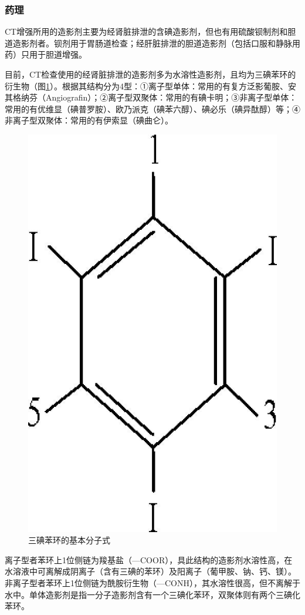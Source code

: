 \subsubsection{药理}

CT增强所用的造影剂主要为经肾脏排泄的含碘造影剂，但也有用硫酸钡制剂和胆道造影剂者。钡剂用于胃肠道检查；经肝脏排泄的胆道造影剂（包括口服和静脉用药）只用于胆道增强。

目前，CT检查使用的经肾脏排泄的造影剂多为水溶性造影剂，且均为三碘苯环的衍生物（图\ref{fig1-1}）。根据其结构分为4型：①离子型单体：常用的有复方泛影葡胺、安其格纳芬（Angiografin）；②离子型双聚体：常用的有碘卡明；③非离子型单体：常用的有优维显（碘普罗胺）、欧乃派克（碘苯六醇）、碘必乐（碘异酞醇）等；④非离子型双聚体：常用的有伊索显（碘曲仑）。

\begin{figure}[!htbp]
 \centering
 \includegraphics[width=.7\textwidth,height=\textheight,keepaspectratio]{./images/Image00002.jpg}
 \captionsetup{justification=centering}
 \caption{三碘苯环的基本分子式}
 \label{fig1-1}
  \end{figure} 

离子型者苯环上1位侧链为羧基盐（---COOR），具此结构的造影剂水溶性高，在水溶液中可离解成阴离子（含有三碘的苯环）及阳离子（葡甲胺、钠、钙、镁）。非离子型者苯环上1位侧链为酰胺衍生物（---CONH），其水溶性很高，但不离解于水中。单体造影剂是指一分子造影剂含有一个三碘化苯环，双聚体则有两个三碘化苯环。

